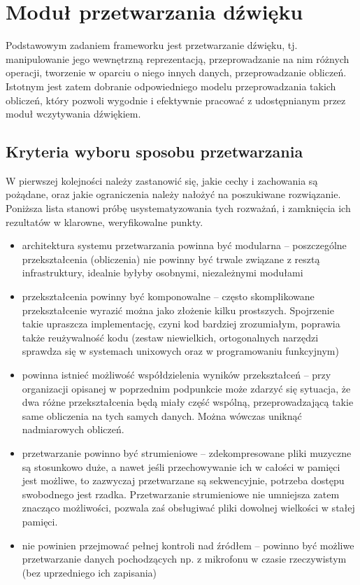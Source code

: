 \chapter{Moduł przetwarzania dźwięku}

Podstawowym zadaniem frameworku jest przetwarzanie dźwięku, tj. manipulowanie jego wewnętrzną
reprezentacją, przeprowadzanie na nim różnych operacji, tworzenie w oparciu o niego innych danych,
przeprowadzanie obliczeń. Istotnym jest zatem dobranie odpowiedniego modelu przeprowadzania takich
obliczeń, który pozwoli wygodnie i efektywnie pracować z udostępnianym przez moduł wczytywania
dźwiękiem.


\section{Kryteria wyboru sposobu przetwarzania}

W pierwszej kolejności należy zastanowić się, jakie cechy i zachowania są pożądane, oraz jakie
ograniczenia należy nałożyć na poszukiwane rozwiązanie. Poniższa lista stanowi próbę
usystematyzowania tych rozważań, i zamknięcia ich rezultatów w klarowne, weryfikowalne punkty.

\begin{itemize}

  \item architektura systemu przetwarzania powinna być modularna -- poszczególne przekształcenia
    (obliczenia) nie powinny być trwale związane z resztą infrastruktury, idealnie byłyby osobnymi,
    niezależnymi modułami

  \item przekształcenia powinny być komponowalne -- często skomplikowane przekształcenie wyrazić
    można jako złożenie kilku prostszych. Spojrzenie takie upraszcza implementację, czyni kod
    bardziej zrozumiałym, poprawia także reużywalność kodu (zestaw niewielkich, ortogonalnych
    narzędzi sprawdza się w systemach unixowych oraz w programowaniu funkcyjnym)

  \item powinna istnieć możliwość współdzielenia wyników przekształceń -- przy organizacji opisanej
    w poprzednim podpunkcie może zdarzyć się sytuacja, że dwa różne przekształcenia będą miały część
    wspólną, przeprowadzającą takie same obliczenia na tych samych danych. Można wówczas uniknąć
    nadmiarowych obliczeń.

  \item przetwarzanie powinno być strumieniowe -- zdekompresowane pliki muzyczne są stosunkowo duże,
    a nawet jeśli przechowywanie ich w całości w pamięci jest możliwe, to zazwyczaj przetwarzane są
    sekwencyjnie, potrzeba dostępu swobodnego jest rzadka. Przetwarzanie strumieniowe nie umniejsza
    zatem znacząco możliwości, pozwala zaś obsługiwać pliki dowolnej wielkości w stałej pamięci.

  \item nie powinien przejmować pełnej kontroli nad źródłem -- powinno być możliwe przetwarzanie
    danych pochodzących np. z mikrofonu w czasie rzeczywistym (bez uprzedniego ich zapisania)

\end{itemize}


